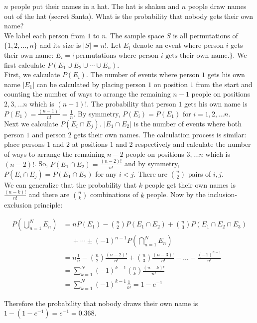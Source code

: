 \documentclass[12pt, a4paper]{article}
\newcounter{exa}
\begin{document}
\begin{texample}
$n$ people put their names in a hat. The hat is shaken and $n$ people draw names out of the hat (secret Santa). What is the probability that nobody gets their own name? \\

We label each person from $1$ to $n$. The sample space $S$ is all permutations of $\{1, 2, \dots, n\}$ and its size is $|S|=n!$. Let $E_i$ denote an event where person $i$ gets their own name: $E_i=\{ \text{permutations where person $i$ gets their own name.} \}$. We first calculate $P(E_1 \cup E_2 \cup \cdots \cup E_n)$. \\

First, we calculate $P(E_i)$. The number of events where person $1$ gets his own name $|E_1|$ can be calculated by placing person $1$ on position $1$ from the start and counting the number of ways to arrange the remaining $n-1$ people on positions $2, 3, \dots n$ which is $(n-1)!$. The probability that person $1$ gets his own name is $P(E_1)=\frac{(n-1)!}{n!}=\frac{1}{n}$. By symmetry, $P(E_i)=P(E_1)$ for $i=1, 2, \dots n$. \\

Next we calculate $P(E_i \cap E_j)$. $|E_1 \cap E_2|$ is the number of events where both person $1$ and person $2$ gets their own names. The calculation process is similar: place persons $1$ and $2$ at positions $1$ and $2$ respectively and calculate the number of ways to arrange the remaining $n-2$ people on positions $3, \dots n$ which is $(n-2)!$. So, $P(E_1 \cap E_2)=\frac{(n-2)!}{n!}$ and by symmetry, $P(E_i \cap E_j)=P(E_1 \cap E_2)$ for any $i<j$. There are $\binom{n}{2}$ pairs of $i,j$. \\

We can generalize that the probability that $k$ people get their own names is $\frac{(n-k)!}{n!}$ and there are $\binom{n}{k}$ combinations of $k$ people. Now by the inclusion-exclusion principle:

\begin{align*}
P\left( \bigcup_{n=1}^N E_n \right) &= n P(E_1) - \binom{n}{2} P(E_1 \cap E_2) + \binom{n}{3} P(E_1 \cap E_2 \cap E_3) \\
&\phantom{-} + \cdots \pm (-1)^{n-1} P\left( \bigcap_{n=1}^N E_n \right) \\
&= n\frac{1}{n} - \binom{n}{2}\frac{(n-2)!}{n!} + \binom{n}{3}\frac{(n-3)!}{n!} - \dots + \frac{(-1)^{n-1}}{n!} \\
&= \sum_{k=1}^N (-1)^{k-1}\binom{n}{k}\frac{(n-k)!}{n!} \\
&= \sum_{k=1}^N (-1)^{k-1} \frac{1}{k!} = 1-e^{-1}
\end{align*}

Therefore the probability that nobody draws their own name is $1-(1-e^{-1})=e^{-1}=0.368$.
\end{texample}
\end{document}
